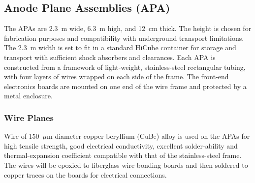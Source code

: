 \subsection{Anode Plane Assemblies (APA)}
\label{subsec:fd-ref-apa}

The APAs are 2.3~m wide, 6.3~m high, and 12~cm thick. The height is
chosen for fabrication purposes and compatibility with underground
transport limitations. The 2.3~m width is set to fit in a standard
HiCube container for storage and transport with sufficient shock
absorbers and clearances.  Each APA is constructed from a framework of
light-weight, stainless-steel rectangular tubing, with four layers of
wires wrapped on each side of the frame. The front-end electronics
boards are mounted on one end of the wire frame and protected by a
metal enclosure.


\subsubsection{Wire Planes}
\label{subsec:fd-ref-wireplanes}

Wire of 150~$\mu$m diameter copper beryllium (CuBe) alloy is used on the
APAs for high tensile strength, good electrical conductivity,
excellent solder-ability and thermal-expansion coefficient
compatible with that of the stainless-steel frame.  The wires will be
epoxied to fiberglass wire bonding boards and then soldered to copper
traces on the boards for electrical connections.

